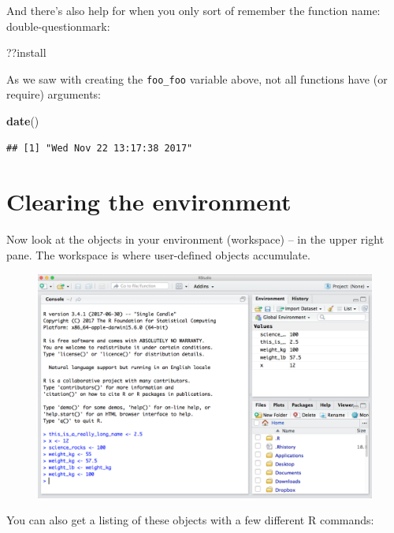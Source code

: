 \documentclass[]{book}
\newenvironment{Shaded}{\begin{snugshade}}{\end{snugshade}}
\newcommand{\KeywordTok}[1]{\textcolor[rgb]{0.13,0.29,0.53}{\textbf{#1}}}
\newcommand{\NormalTok}[1]{#1}
\theoremstyle{definition}
\theoremstyle{definition}
\theoremstyle{definition}
\theoremstyle{remark}
\begin{document}
And there's also help for when you only sort of remember the function
name: double-questionmark:

\begin{Shaded}
\begin{Highlighting}[]
\NormalTok{??install }
\end{Highlighting}
\end{Shaded}

As we saw with creating the \texttt{foo\_foo} variable above, not all
functions have (or require) arguments:

\begin{Shaded}
\begin{Highlighting}[]
\KeywordTok{date}\NormalTok{()}
\end{Highlighting}
\end{Shaded}

\begin{verbatim}
## [1] "Wed Nov 22 13:17:38 2017"
\end{verbatim}

\section{Clearing the environment}\label{clearing-the-environment}

Now look at the objects in your environment (workspace) -- in the upper
right pane. The workspace is where user-defined objects accumulate.

\begin{figure}
\centering
\includegraphics{img/RStudio_IDE_env.png}
\caption{}
\end{figure}

You can also get a listing of these objects with a few different R
commands:
\end{document}
